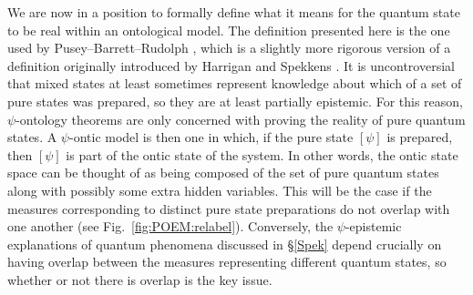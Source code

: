 \documentclass[DIV=calc,paper=a4,fontsize=11pt,twocolumn]{scrartcl} %
\theoremstyle{definition}
\theoremstyle{plain}
\newcommand{\Proj}[1]{\ensuremath{\left [ #1 \right ]}}
\begin{document}
We are now in a position to formally define what it means for the
quantum state to be real within an ontological model.  The definition
presented here is the one used by Pusey--Barrett--Rudolph \cite{Pusey2012}, which is a
slightly more rigorous version of a definition originally introduced
by Harrigan and Spekkens \cite{Harrigan2010}.  It is uncontroversial
that mixed states at least sometimes represent knowledge about which
of a set of pure states was prepared, so they are at least partially
epistemic.  For this reason, $\psi$-ontology theorems are only
concerned with proving the reality of pure quantum states.  A
$\psi$-ontic model is then one in which, if the pure state
$\Proj{\psi}$ is prepared, then $\Proj{\psi}$ is part of the ontic
state of the system.  In other words, the ontic state space can be
thought of as being composed of the set of pure quantum states along
with possibly some extra hidden variables.  This will be the case if
the measures corresponding to distinct pure state preparations do not
overlap with one another (see Fig.~\ref{fig:POEM:relabel}).
Conversely, the $\psi$-epistemic explanations of quantum phenomena
discussed in \S\ref{Spek} depend crucially on having overlap between
the measures representing different quantum states, so whether or not
there is overlap is the key issue.
\end{document}
